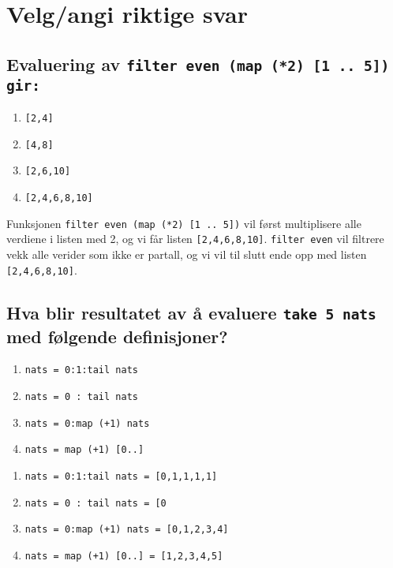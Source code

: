 \documentclass{article}
\begin{document}
    \section{Velg/angi riktige svar}

    \subsection{Evaluering av \texttt{filter even (map (*2) [1 .. 5]) gir:}}
    \begin{enumerate}[label=\alph*)]
        \item \texttt{[2,4]}
        \item \texttt{[4,8]}
        \item \texttt{[2,6,10]}
        \item \texttt{[2,4,6,8,10]}
    \end{enumerate}

    \begin{ans}
        Funksjonen \texttt{filter even (map (*2) [1 .. 5])} vil først multiplisere alle verdiene i listen med 2, og vi får listen \texttt{[2,4,6,8,10]}. \texttt{filter even} vil filtrere vekk alle verider som ikke er partall, og vi vil til slutt ende opp med listen \texttt{[2,4,6,8,10]}.
    \end{ans}

    \subsection{Hva blir resultatet av å evaluere \texttt{take 5 nats} med følgende definisjoner?} 

    \begin{enumerate}[label=\alph*)]
        \item \texttt{nats = 0:1:tail nats}
        \item \texttt{nats = 0 : tail nats}
        \item \texttt{nats = 0:map (+1) nats}
        \item \texttt{nats = map (+1) [0..]}
    \end{enumerate}

    \begin{ans}
    \begin{enumerate}[label=\alph*)]
        \item \texttt{nats = 0:1:tail nats = [0,1,1,1,1]}
        \item \texttt{nats = 0 : tail nats = [0}
        \item \texttt{nats = 0:map (+1) nats = [0,1,2,3,4]}
        \item \texttt{nats = map (+1) [0..] = [1,2,3,4,5]}
    \end{enumerate}
    \end{ans}
\end{document}
